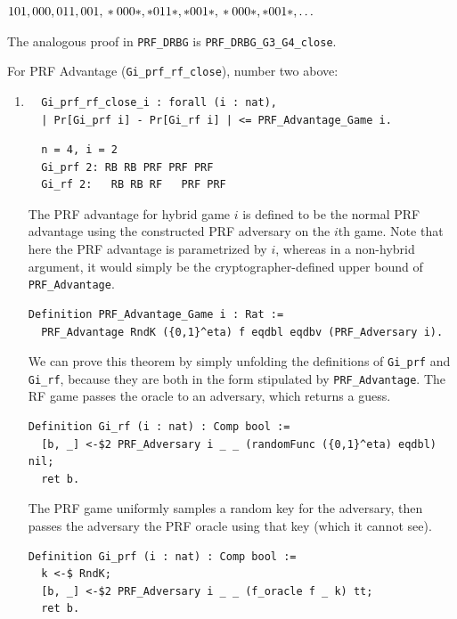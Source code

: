 \documentclass[12pt,lot, lof]{puthesis}
\newcommand{\li} {\lstinline}
\begin{document}
{\begin{enumerate}
  $101, 000, 011, 001, \\
      *000*, *011*, *001*, \\
      *000*, *001*, \ldots$

  The analogous proof in \li|PRF_DRBG| is \li|PRF_DRBG_G3_G4_close|.
  
\end{enumerate}

For PRF Advantage (\lstinline|Gi_prf_rf_close|), number two above:

\begin{enumerate}
\par
\item 
\begin{lstlisting}
  Gi_prf_rf_close_i : forall (i : nat), 
  | Pr[Gi_prf i] - Pr[Gi_rf i] | <= PRF_Advantage_Game i. 
  \end{lstlisting}
    
  \begin{lstlisting}
  n = 4, i = 2
  Gi_prf 2: RB RB PRF PRF PRF
  Gi_rf 2:   RB RB RF   PRF PRF
  \end{lstlisting}
  
  The PRF advantage for hybrid game $i$ is defined to be the normal PRF advantage using the constructed PRF adversary on the $i$th game. Note that here the PRF advantage is parametrized by $i$, whereas in a non-hybrid argument, it would simply be the cryptographer-defined upper bound of \li|PRF_Advantage|.
 
 \begin{lstlisting}
Definition PRF_Advantage_Game i : Rat := 
  PRF_Advantage RndK ({0,1}^eta) f eqdbl eqdbv (PRF_Adversary i).
  \end{lstlisting}

   We can prove this theorem by simply unfolding the definitions of \li|Gi_prf| and \li|Gi_rf|, because they are both in the form stipulated by \li|PRF_Advantage|. The RF game passes the oracle to an adversary, which returns a guess.
   
\begin{lstlisting}
Definition Gi_rf (i : nat) : Comp bool :=
  [b, _] <-$2 PRF_Adversary i _ _ (randomFunc ({0,1}^eta) eqdbl) nil;
  ret b.
\end{lstlisting}  

The PRF game uniformly samples a random key for the adversary, then passes the adversary the PRF oracle using that key (which it cannot see).

\begin{lstlisting}
Definition Gi_prf (i : nat) : Comp bool :=
  k <-$ RndK;
  [b, _] <-$2 PRF_Adversary i _ _ (f_oracle f _ k) tt;
  ret b.
\end{lstlisting}  
  

\end{enumerate}}
\end{document}

